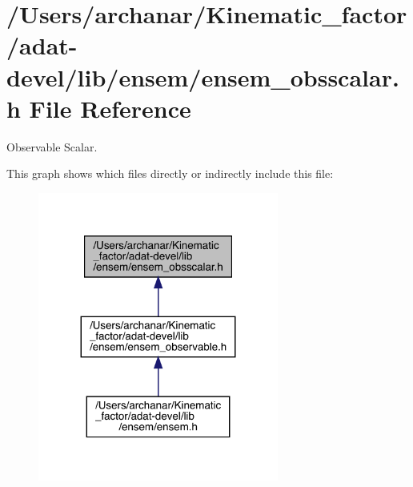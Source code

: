 \hypertarget{adat-devel_2lib_2ensem_2ensem__obsscalar_8h}{}\section{/\+Users/archanar/\+Kinematic\+\_\+factor/adat-\/devel/lib/ensem/ensem\+\_\+obsscalar.h File Reference}
\label{adat-devel_2lib_2ensem_2ensem__obsscalar_8h}


Observable Scalar.  


This graph shows which files directly or indirectly include this file\+:
\nopagebreak
\begin{figure}[H]
\begin{center}
\leavevmode
\includegraphics[width=224pt]{d6/d03/adat-devel_2lib_2ensem_2ensem__obsscalar_8h__dep__incl}
\end{center}
\end{figure}
